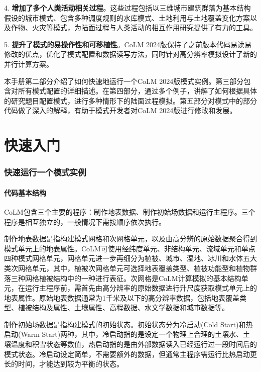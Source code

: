 \documentclass[a4paper,12pt,twoside]{article}
\begin{document}
4. \textbf{增加了多个人类活动相关过程}。这些过程包括以三维城市建筑群落为基本结构假设的城市模式、包含多种调度规则的水库模式、土地利用与土地覆盖变化方案以及作物、火灾等模式，为陆面过程与人类活动的相互作用研究提供了有力的工具。

5. \textbf{提升了模式的易操作性和可移植性}。CoLM 2024版保持了之前版本代码易读易修改的优点，优化了模式配置和数据读写方法，同时针对高分辨率模拟设计了新的并行计算方案。

本手册第二部分介绍了如何快速地运行一个CoLM 2024版模式实例。第三部分包含对所有模式配置的详细描述。在第四部分，通过多个例子，讲解了如何根据具体的研究题目配置模式，进行多种情形下的陆面过程模拟。第五部分对模式中的部分代码做了深入的解释，有助于模式开发者对CoLM 2024版进行修改和发展。

\clearpage

\part{快速入门}
\section{快速运行一个模式实例}\label{chapter01}

\subsection{代码基本结构}

CoLM包含三个主要的程序：制作地表数据、制作初始场数据和运行主程序。三个程序是相互独立的，一般情况下需按顺序依次执行。

制作地表数据是指构建模式网格和次网格单元，以及由高分辨的原始数据聚合得到模式单元上的地表属性。CoLM可使用经纬度单元、非结构单元、流域单元和单点四种模式网格单元，网格单元进一步再细分为植被、城市、湿地、冰川和水体五大类次网格单元，其中，植被次网格单元可选择地表覆盖类型、植被功能型和植物群落三种网格植被结构中的一种进行表征。次网格是CoLM计算模拟的基本结构单元，在运行主程序前，需首先由高分辨率的原始数据进行升尺度获取模式单元上的地表属性。原始地表数据通常为1千米及以下的高分辨率数据，包括地表覆盖类型、植被结构及属性、土壤属性、高程数据、水文学数据和城市数据等。

制作初始场数据是指构建模式的初始状态。初始状态分为冷启动(Cold Start)和热启动(Warm Start)两种，其中，冷启动指的是设定一个物理上合理的土壤水、土壤温度和积雪状态等数值，热启动指的是由外部数据读入已经运行过一段时间后的模式状态。冷启动设定简单，不需要额外的数据，但通常主程序需运行比热启动更长的时间，才能达到较为平衡的状态。
\end{document}
